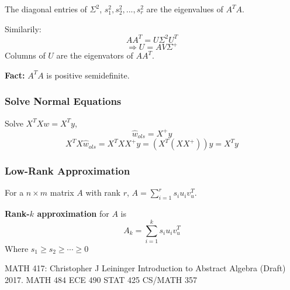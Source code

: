 \documentclass[11pt,a4paper]{article}
\begin{document}
The diagonal entries of $\Sigma^2$, $s_1^2,s_2^2,...,s_r^2$ are the eigenvalues of $A^TA$.

Similarily: $$AA^T=U\Sigma^2U^T$$
$$\Rightarrow U=AV\Sigma^+$$
Columns of $U$ are the eigenvators of $AA^T$.

\textbf{Fact:} $A^TA$ is positive semidefinite.

\subsubsection{Solve Normal Equations}
Solve $X^TXw=X^Ty$, $$\hat{w}_{ols}=X^+y$$
$$X^TX\hat{w}_{ols}=X^TXX^+y=(X^T(XX^+))y=X^Ty$$

\subsubsection{Low-Rank Approximation}
For a $n\times m$ matrix $A$ with rank $r$, $A=\sum_{i=1}^rs_iu_iv_u^T$.

\textbf{Rank-$k$ approximation} for $A$ is
$$A_k=\sum_{i=1}^ks_iu_iv_u^T$$
Where $s_1\geq s_2\geq \cdots\geq 0$




\begin{thebibliography}{1}
      MATH 417: Christopher J Leininger  \newblock Introduction to Abstract Algebra (Draft)  2017.
     MATH 484
     ECE 490
     STAT 425
     CS/MATH 357
\end{thebibliography}
\end{document}
